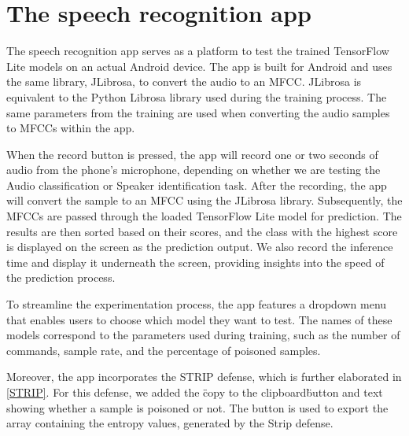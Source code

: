 \documentclass{report}
\theoremstyle{definition}
\theoremstyle{remark}
\begin{document}
\section{The speech recognition app}
The speech recognition app serves as a platform to test the trained TensorFlow Lite models on an actual Android device. The app is built for Android and uses the same library, JLibrosa, to convert the audio to an MFCC. JLibrosa is equivalent to the Python Librosa library used during the training process. The same parameters from the training are used when converting the audio samples to MFCCs within the app. 

When the record button is pressed, the app will record one or two seconds of audio from the phone's microphone, depending on whether we are testing the Audio classification or Speaker identification task. After the recording, the app will convert the sample to an MFCC using the JLibrosa library\cite{Jlibrosa}. Subsequently, the MFCCs are passed through the loaded TensorFlow Lite model for prediction. The results are then sorted based on their scores, and the class with the highest score is displayed on the screen as the prediction output. We also record the inference time and display it underneath the screen, providing insights into the speed of the prediction process.

To streamline the experimentation process, the app features a dropdown menu that enables users to choose which model they want to test. The names of these models correspond to the parameters used during training, such as the number of commands, sample rate, and the percentage of poisoned samples.

Moreover, the app incorporates the STRIP defense, which is further elaborated in \autoref{STRIP}. For this defense, we added the \"copy to the clipboard\" button and text showing whether a sample is poisoned or not. The button is used to export the array containing the entropy values, generated by the Strip defense. 
\end{document}
